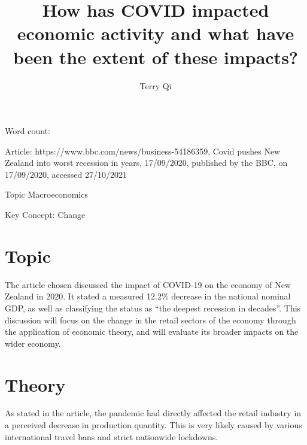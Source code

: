 \documentclass[a4paper,12pt]{article}
\title{How has COVID impacted economic activity and what have been the extent of these impacts?}
\author{Terry Qi}
\begin{document}
\maketitle
\newpage
Word count:

Article: https://www.bbc.com/news/business-54186359, Covid pushes New Zealand into worst recession in years, 17/09/2020, published by the BBC, on 17/09/2020, accessed 27/10/2021

Topic Macroeconomics

Key Concept: Change




\section*{Topic}
The article chosen discussed the impact of COVID-19 on the economy of New Zealand in 2020. It stated a measured 12.2\% decrease in the national nominal GDP, as well as classifying the status as ``the deepest recession in decades''. This discussion will focus on the change in the retail sectors of the economy through the application of economic theory, and will evaluate its broader impacts on the wider economy.

\section*{Theory}
As stated in the article, the pandemic had directly affected the retail industry in a perceived decrease in production quantity. This is very likely caused by various international travel bans and strict nationwide lockdowns.
\end{document}
